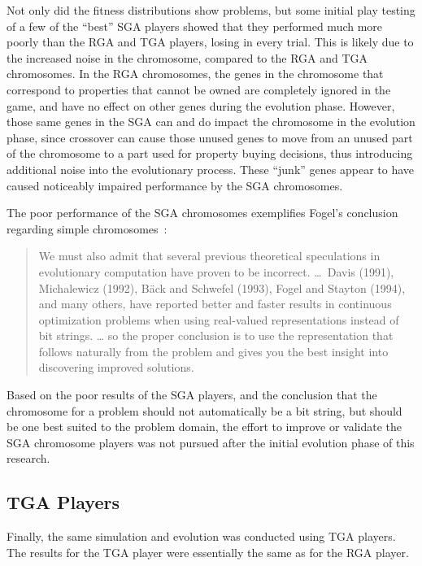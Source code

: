 Not only did the fitness distributions show problems, but some initial play
testing of a few of the ``best'' SGA players showed that they performed much
more poorly than the RGA and TGA players, losing in every trial. This is likely
due to the increased noise in the chromosome, compared to the RGA and TGA
chromosomes. In the RGA chromosomes, the genes in the chromosome that correspond
to properties that cannot be owned are completely ignored in the game, and have
no effect on other genes during the evolution phase. However, those same genes
in the SGA can and do impact the chromosome in the evolution phase, since
crossover can cause those unused genes to move from an unused part of the
chromosome to a part used for property buying decisions, thus introducing
additional noise into the evolutionary process. These ``junk'' genes appear to
have caused noticeably impaired performance by the SGA chromosomes.

The poor performance of the SGA chromosomes exemplifies Fogel's conclusion
regarding simple chromosomes~\cite{fogel1999intelligence}:

\begin{quote}
We must also admit that several previous theoretical speculations in
evolutionary computation have proven to be incorrect. \ldots~Davis (1991),
Michalewicz (1992), B\"ack and Schwefel (1993), Fogel and Stayton (1994), and
many others, have reported better and faster results in continuous optimization
problems when using real-valued representations instead of bit strings. \ldots
so the proper conclusion is to use the representation that follows naturally
from the problem and gives you the best insight into discovering improved
solutions.
\end{quote}

Based on the poor results of the SGA players, and the conclusion that the
chromosome for a problem should not automatically be a bit string, but should be
one best suited to the problem domain, the effort to improve or validate the SGA
chromosome players was not pursued after the initial evolution phase of this
research.

\subsection{TGA Players} \label{6_TGA}

Finally, the same simulation and evolution was conducted using TGA players. The
results for the TGA player were essentially the same as for the RGA player.


